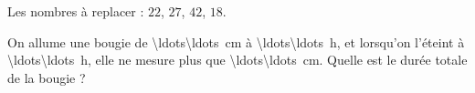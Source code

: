 
\begin{exercice}\label{exo2smath-0116}

    Les nombres à replacer : \( 22\), \( 27\), \( 42\), \( 18\).

    On allume une bougie de \SI{\ldots\ldots}{\centi\meter} à \SI{\ldots\ldots}{\hour}, et lorsqu'on l'éteint à \SI{\ldots\ldots}{\hour}, elle ne mesure plus que \SI{\ldots\ldots}{\centi\meter}. Quelle est le durée totale de la bougie ?

\end{exercice}
